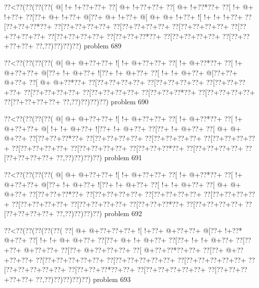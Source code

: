 \vbox{\vbox{\goo
\0??<\0??(\0??(\0??(\0??(
\- @[\- !+\- !+\0??+\0??+
\0??[\- @+\- !+\0??+\0??+
\0??[\- @+\- !+\0??*\0??+
\0??[\- !+\- @+\- !+\0??+
\0??[\0??+\- @+\- !+\0??+
\- @[\0??+\- @+\- !+\0??+
\- @[\- @+\- @+\- !+\0??+
\- ![\- !+\- !+\- !+\0??+
\0??[\0??+\0??+\0??*\0??+
\0??[\0??+\0??+\0??+\0??+
\0??[\0??+\0??+\0??+\0??+
\0??[\0??+\0??+\0??+\0??+
\0??[\0??+\0??+\0??+\0??+
\0??[\0??+\0??+\0??+\0??+
\0??[\0??+\0??+\0??*\0??+
\0??[\0??+\0??+\0??+\0??+
\0??[\0??+\0??+\0??+\0??+
\0??,\0??)\0??)\0??)\0??)
}
\hfil problem 689\hfil\break
}

\vbox{\vbox{\goo
\0??<\0??(\0??(\0??(\0??(
\- @[\- @+\- @+\0??+\0??+
\- ![\- !+\- @+\0??+\0??+
\0??[\- !+\- @+\0??*\0??+
\0??[\- !+\- @+\0??+\0??+
\- @[\0??+\- !+\- @+\0??+
\- ![\0??+\- !+\- @+\0??+
\0??[\- !+\- !+\- @+\0??+
\- @[\0??+\0??+\- @+\0??+
\0??[\- @+\- @+\0??*\0??+
\0??[\0??+\0??+\0??+\0??+
\0??[\0??+\0??+\0??+\0??+
\0??[\0??+\0??+\0??+\0??+
\0??[\0??+\0??+\0??+\0??+
\0??[\0??+\0??+\0??+\0??+
\0??[\0??+\0??+\0??*\0??+
\0??[\0??+\0??+\0??+\0??+
\0??[\0??+\0??+\0??+\0??+
\0??,\0??)\0??)\0??)\0??)
}
\hfil problem 690\hfil\break
}

\vbox{\vbox{\goo
\0??<\0??(\0??(\0??(\0??(
\- @[\- @+\- @+\0??+\0??+
\- ![\- !+\- @+\0??+\0??+
\0??[\- !+\- @+\0??*\0??+
\0??[\- !+\- @+\0??+\0??+
\- @[\- !+\- !+\- @+\0??+
\- ![\0??+\- !+\- @+\0??+
\0??[\0??+\- !+\- @+\0??+
\0??[\- @+\- @+\- @+\0??+
\0??[\0??+\0??+\0??*\0??+
\0??[\0??+\0??+\0??+\0??+
\0??[\0??+\0??+\0??+\0??+
\0??[\0??+\0??+\0??+\0??+
\0??[\0??+\0??+\0??+\0??+
\0??[\0??+\0??+\0??+\0??+
\0??[\0??+\0??+\0??*\0??+
\0??[\0??+\0??+\0??+\0??+
\0??[\0??+\0??+\0??+\0??+
\0??,\0??)\0??)\0??)\0??)
}
\hfil problem 691\hfil\break
}

\vbox{\vbox{\goo
\0??<\0??(\0??(\0??(\0??(
\- @[\- @+\- @+\0??+\0??+
\- ![\- !+\- @+\0??+\0??+
\0??[\- !+\- @+\0??*\0??+
\0??[\- !+\- @+\0??+\0??+
\- @[\0??+\- !+\- @+\0??+
\- ![\0??+\- !+\- @+\0??+
\0??[\- !+\- !+\- @+\0??+
\0??[\- @+\- @+\- @+\0??+
\0??[\0??+\0??+\0??*\0??+
\0??[\0??+\0??+\0??+\0??+
\0??[\0??+\0??+\0??+\0??+
\0??[\0??+\0??+\0??+\0??+
\0??[\0??+\0??+\0??+\0??+
\0??[\0??+\0??+\0??+\0??+
\0??[\0??+\0??+\0??*\0??+
\0??[\0??+\0??+\0??+\0??+
\0??[\0??+\0??+\0??+\0??+
\0??,\0??)\0??)\0??)\0??)
}
\hfil problem 692\hfil\break
}

\vbox{\vbox{\goo
\0??<\0??(\0??(\0??(\0??(\0??(
\0??[\- @+\- @+\0??+\0??+\0??+
\- ![\- !+\0??+\- @+\0??+\0??+
\- @[\0??+\- !+\0??*\- @+\0??+
\0??[\- !+\- !+\- @+\- @+\0??+
\0??[\0??+\- @+\- !+\- @+\0??+
\0??[\0??+\- !+\- !+\- @+\0??+
\0??[\0??+\0??+\- @+\0??+\0??+
\0??[\0??+\- @+\0??+\0??+\0??+
\0??[\- @+\0??+\0??*\0??+\0??+
\0??[\0??+\- @+\0??+\0??+\0??+
\0??[\0??+\0??+\0??+\0??+\0??+
\0??[\0??+\0??+\0??+\0??+\0??+
\0??[\0??+\0??+\0??+\0??+\0??+
\0??[\0??+\0??+\0??+\0??+\0??+
\0??[\0??+\0??+\0??*\0??+\0??+
\0??[\0??+\0??+\0??+\0??+\0??+
\0??[\0??+\0??+\0??+\0??+\0??+
\0??,\0??)\0??)\0??)\0??)\0??)
}
\hfil problem 693\hfil\break
}

